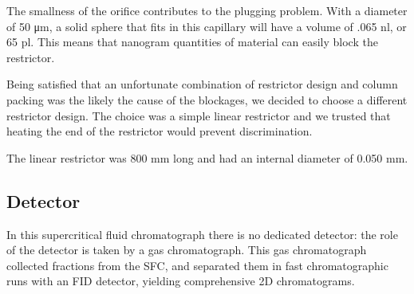 The smallness of the orifice contributes to the plugging problem. With a
diameter of 50 \si{\micro\metre}, a solid sphere that fits in this capillary
will have a volume of .065 \si{\nano\litre}, or 65 \si{\pico\litre}. This means
that nanogram quantities of material can easily block the restrictor.

Being satisfied that an unfortunate combination of restrictor design and column
packing was the likely the cause of the blockages, we decided to choose a
different restrictor design. The choice was a simple linear restrictor and
we trusted that heating the end of the restrictor would prevent discrimination.

The linear restrictor was 800 \si{\milli\metre} long and had an internal
diameter of 0.050 \si{\milli\metre}.

\subsection{Detector}

In this supercritical fluid chromatograph there is no dedicated detector: the
role of the detector is taken by a gas chromatograph. This gas chromatograph
collected fractions from the SFC, and separated them in fast chromatographic
runs with an FID detector, yielding comprehensive 2D chromatograms.

\todos